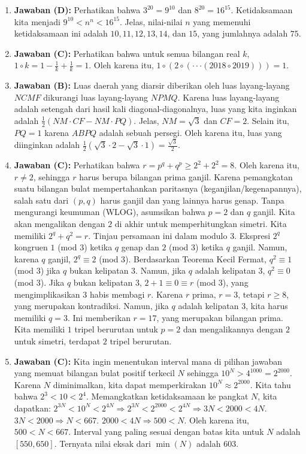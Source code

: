 \documentclass{article}
\begin{document}
\begin{enumerate}
\item \textbf{Jawaban (D):} Perhatikan bahwa $3^{20}=9^{10}$ dan $8^{20}=16^{15}$. Ketidaksamaan kita menjadi $9^{10}<n^{n}<16^{15}$. Jelas, nilai-nilai $n$ yang memenuhi ketidaksamaan ini adalah $10, 11, 12, 13, 14$, dan $15$, yang jumlahnya adalah $75$.

\item \textbf{Jawaban (C):} Perhatikan bahwa untuk semua bilangan real $k$, $1\circ k=1-\frac{1}{k}+\frac{1}{k}=1$. Oleh karena itu, $1\circ(2\circ(\cdot\cdot\cdot(2018\circ2019)))=1$.

\item \textbf{Jawaban (B):} Luas daerah yang diarsir diberikan oleh luas layang-layang $NCMF$ dikurangi luas layang-layang $NPMQ$. Karena luas layang-layang adalah setengah dari hasil kali diagonal-diagonalnya, luas yang kita inginkan adalah $\frac{1}{2}(NM\cdot CF-NM\cdot PQ)$. Jelas, $NM=\sqrt{3}$ dan $CF=2$. Selain itu, $PQ=1$ karena $ABPQ$ adalah sebuah persegi. Oleh karena itu, luas yang diinginkan adalah $\frac{1}{2}(\sqrt{3}\cdot2-\sqrt{3}\cdot1)=\frac{\sqrt{3}}{2}$.

\item \textbf{Jawaban (C):} Perhatikan bahwa $r=p^{q}+q^{p}\ge2^{2}+2^{2}=8$. Oleh karena itu, $r\ne2$, sehingga $r$ harus berupa bilangan prima ganjil. Karena pemangkatan suatu bilangan bulat mempertahankan paritasnya (keganjilan/kegenapannya), salah satu dari $(p, q)$ harus ganjil dan yang lainnya harus genap. Tanpa mengurangi keumuman (WLOG), asumsikan bahwa $p=2$ dan $q$ ganjil. Kita akan mengalikan dengan $2$ di akhir untuk memperhitungkan simetri. Kita memiliki $2^{q}+q^{2}=r$. Tinjau persamaan ini dalam modulo $3$. Ekspresi $2^{q}$ kongruen $1$ (mod $3$) ketika $q$ genap dan $2$ (mod $3$) ketika $q$ ganjil. Namun, karena $q$ ganjil, $2^{q}\equiv2$ (mod $3$). Berdasarkan Teorema Kecil Fermat, $q^{2}\equiv1$ (mod $3$) jika $q$ bukan kelipatan $3$. Namun, jika $q$ adalah kelipatan $3$, $q^{2}\equiv0$ (mod $3$). Jika $q$ bukan kelipatan $3$, $2+1\equiv0\equiv r$ (mod $3$), yang mengimplikasikan $3$ habis membagi $r$. Karena $r$ prima, $r=3$, tetapi $r\ge8$, yang merupakan kontradiksi. Namun, jika $q$ adalah kelipatan $3$, kita harus memiliki $q=3$. Ini memberikan $r=17$, yang merupakan bilangan prima. Kita memiliki $1$ tripel berurutan untuk $p=2$ dan mengalikannya dengan $2$ untuk simetri, terdapat $2$ tripel berurutan.

\item \textbf{Jawaban (C):} Kita ingin menentukan interval mana di pilihan jawaban yang memuat bilangan bulat positif terkecil $N$ sehingga $10^{N}>4^{1000}=2^{2000}$. Karena $N$ diminimalkan, kita dapat memperkirakan $10^{N}\approx2^{2000}$. Kita tahu bahwa $2^{3}<10<2^{4}$. Memangkatkan ketidaksamaan ke pangkat $N$, kita dapatkan: $2^{3N}<10^{N}<2^{4N}\Rightarrow2^{3N}<2^{2000}<2^{4N}\Rightarrow3N<2000<4N$. $3N<2000\Rightarrow N<667$. $2000<4N\Rightarrow500<N$. Oleh karena itu, $500<N<667$. Interval yang paling sesuai dengan batas kita untuk $N$ adalah $[550,650]$. Ternyata nilai eksak dari $\min(N)$ adalah $603$.


\end{enumerate}
\end{document}
